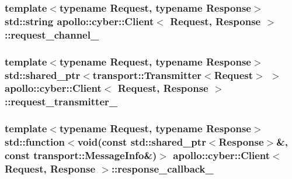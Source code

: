 \hypertarget{classapollo_1_1cyber_1_1Client_a164eeec085d6018b94887d920afc4d8d}{
\subsubsection[{request\-\_\-channel\-\_\-}]{\setlength{\rightskip}{0pt plus 5cm}template$<$typename Request, typename Response$>$ std\-::string {\bf apollo\-::cyber\-::\-Client}$<$ Request, Response $>$\-::request\-\_\-channel\-\_\-\hspace{0.3cm}{\ttfamily [private]}}}\label{classapollo_1_1cyber_1_1Client_a164eeec085d6018b94887d920afc4d8d}
\hypertarget{classapollo_1_1cyber_1_1Client_a1586ab328b13d0f26190e13d78c5eb63}{
\subsubsection[{request\-\_\-transmitter\-\_\-}]{\setlength{\rightskip}{0pt plus 5cm}template$<$typename Request, typename Response$>$ std\-::shared\-\_\-ptr$<${\bf transport\-::\-Transmitter}$<$Request$>$ $>$ {\bf apollo\-::cyber\-::\-Client}$<$ Request, Response $>$\-::request\-\_\-transmitter\-\_\-\hspace{0.3cm}{\ttfamily [private]}}}\label{classapollo_1_1cyber_1_1Client_a1586ab328b13d0f26190e13d78c5eb63}
\hypertarget{classapollo_1_1cyber_1_1Client_a19e85f76c829899b989a7fcafe5aae97}{
\subsubsection[{response\-\_\-callback\-\_\-}]{\setlength{\rightskip}{0pt plus 5cm}template$<$typename Request, typename Response$>$ std\-::function$<$void(const std\-::shared\-\_\-ptr$<$Response$>$\&, const {\bf transport\-::\-Message\-Info}\&)$>$ {\bf apollo\-::cyber\-::\-Client}$<$ Request, Response $>$\-::response\-\_\-callback\-\_\-\hspace{0.3cm}{\ttfamily [private]}}}\label{classapollo_1_1cyber_1_1Client_a19e85f76c829899b989a7fcafe5aae97}
